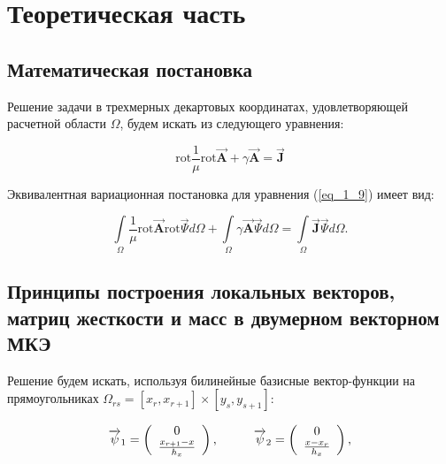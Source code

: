 \chapter{Теоретическая часть}

\section{Математическая постановка}

Решение задачи в трехмерных декартовых координатах, удовлетворяющей расчетной области $\Omega$, будем искать из следующего уравнения:

\begin{equation} \label{eq_1_9}
	\text{rot} \frac{1}{\mu} \text{rot} \overrightarrow{\textbf{A}} + \gamma\overrightarrow{\textbf{A}} = \overrightarrow{\textbf{J}}
\end{equation}

Эквивалентная вариационная постановка для уравнения (\ref{eq_1_9}) имеет вид:

\begin{equation} \label{eq_1_11}
	\int \limits_{\Omega} \frac{1}{\mu} \text{rot} \overrightarrow{\textbf{A}} \text{rot} \overrightarrow{\textbf{$\Psi$}} d \Omega + 
	\int \limits_{\Omega} \gamma\overrightarrow{\textbf{A}} \overrightarrow{\textbf{$\Psi$}} d \Omega  = \int \limits_{\Omega} \overrightarrow{\textbf{J}} \overrightarrow{\textbf{$\Psi$}}  d \Omega.
\end{equation}

\section{Принципы построения локальных векторов, матриц жесткости и масс в двумерном векторном МКЭ}

Решение будем искать, используя билинейные базисные вектор-функции  на прямоугольниках $\Omega_{rs} = [x_r, x_{r+1}] \times [y_s, y_{s+1}]$:

\begin{equation*}
	\overrightarrow{\psi}_1 = \left(
	\begin{array}{c}
		0\\
		\frac{x_{r + 1} - x}{h_x}\\
	\end{array}
	\right),
	\hspace{10mm}
	\overrightarrow{\psi}_2 = \left(
	\begin{array}{c}
		0\\
		\frac{x - x_r}{h_x}\\
	\end{array}
	\right),
\end{equation*}

